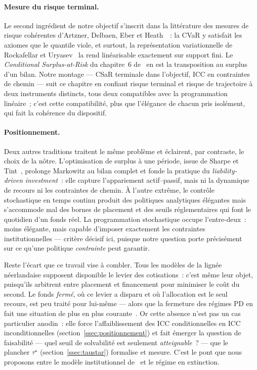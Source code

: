 \documentclass[11pt,letterpaper]{article}
\newcommand{\taustar}{\tau^{\star}}
\theoremstyle{definition}
\begin{document}
\paragraph{Mesure du risque terminal.}
Le second ingrédient de notre objectif s'inscrit dans la littérature des
mesures de risque cohérentes d'Artzner, Delbaen, Eber et
Heath~\cite{Artzner1999}~: la CVaR y satisfait les axiomes que le quantile
viole, et surtout, la représentation variationnelle de Rockafellar et
Uryasev~\cite{RU2000} la rend linéarisable exactement sur support fini. Le
\emph{Conditional Surplus-at-Risk} du chapitre~6 de~\cite{KHvdVR2020} en est
la transposition au surplus d'un bilan. Notre montage --- CSaR terminale dans
l'objectif, ICC en contraintes de chemin --- suit ce chapitre en confiant
risque terminal et risque de trajectoire à deux instruments distincts, tous
deux compatibles avec la programmation linéaire~; c'est cette compatibilité,
plus que l'élégance de chacun pris isolément, qui fait la cohérence du
dispositif.

\paragraph{Positionnement.}
Deux autres traditions traitent le même problème et éclairent, par contraste,
le choix de la nôtre. L'optimisation de surplus à une période, issue de Sharpe
et Tint~\cite{SharpeTint1990}, prolonge Markowitz au bilan complet et fonde la
pratique du \emph{liability-driven investment}~: elle capture l'appariement
actif--passif, mais ni la dynamique de recours ni les contraintes de chemin.
À l'autre extrême, le contrôle stochastique en temps continu produit des
politiques analytiques élégantes mais s'accommode mal des bornes de placement
et des seuils réglementaires qui font le quotidien d'un fonds réel. La
programmation stochastique occupe l'entre-deux~: moins élégante, mais capable
d'imposer exactement les contraintes institutionnelles --- critère décisif
ici, puisque notre question porte précisément sur ce qu'une politique
\emph{contrainte} peut garantir.

Reste l'écart que ce travail vise à combler. Tous les modèles de la lignée
néerlandaise supposent disponible le levier des cotisations~: c'est même leur
objet, puisqu'ils arbitrent entre placement et financement pour minimiser le
coût du second. Le fonds \emph{fermé}, où ce levier a disparu et où
l'allocation est le seul recours, est peu traité pour lui-même --- alors que
la fermeture des régimes PD en fait une situation de plus en plus
courante~\cite{Broadbent2006}. Or cette absence n'est pas un cas particulier
anodin~: elle force l'affaiblissement des ICC conditionnelles en ICC
inconditionnelles (section~\ref{ssec:positionnement}) et fait émerger la
question de faisabilité --- quel seuil de solvabilité est seulement
\emph{atteignable}~? --- que le plancher $\taustar$
(section~\ref{ssec:taustar}) formalise et mesure. C'est le pont que nous
proposons entre le modèle institutionnel de~\cite{KHSV2010} et le régime en
extinction.
\end{document}
